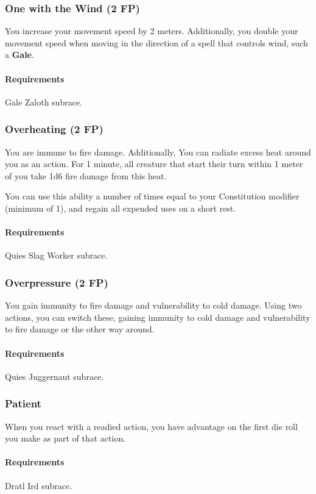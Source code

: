 \subsubsection{One with the Wind (2 FP)} \label{feat::onewiththewind}
    You increase your movement speed by 2 meters.
    Additionally, you double your movement speed when moving in the direction of a spell that controls wind, such a \textbf{Gale}.
    \paragraph{Requirements} Gale Zaloth subrace.
\subsubsection{Overheating (2 FP)} \label{feat::overheating}
    You are immune to fire damage.
    Additionally, You can radiate excess heat around you as an action.
    For 1 minute, all creature that start their turn within 1 meter of you take 1d6 fire damage from this heat.

    You can use this ability a number of times equal to your Constitution modifier (minimum of 1), and regain all expended uses on a short rest.
    \paragraph{Requirements} Quies Slag Worker subrace.
\subsubsection{Overpressure (2 FP)} \label{feat::overpressure}
    You gain immunity to fire damage and vulnerability to cold damage.
    Using two actions, you can switch these, gaining immunity to cold damage and vulnerability to fire damage or the other way around.
    \paragraph{Requirements} Quies Juggernaut subrace.
\subsubsection{Patient} \label{feat::patient}
    When you react with a readied action, you have advantage on the first die roll you make as part of that action.
    \paragraph{Requirements} Dratl Ird subrace.
